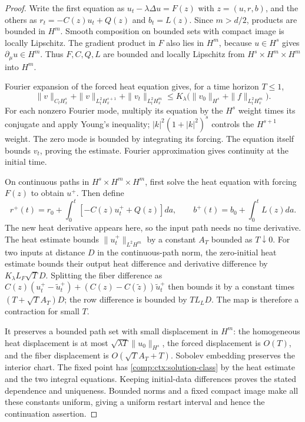 \begin{proof}
Write the first equation as $u_t-\lambda\Delta u=F(z)$ with $z=(u,r,b)$, and the others as $r_t=-C(z)u_t+Q(z)$ and $b_t=L(z)$. Since $m>d/2$, products are bounded in $H^m$. Smooth composition on bounded sets with compact image is locally Lipschitz. The gradient product in $F$ also lies in $H^m$, because $u\in H^s$ gives $\partial_\mu u\in H^m$. Thus $F,C,Q,L$ are bounded and locally Lipschitz from $H^s\times H^m\times H^m$ into $H^m$.

Fourier expansion of the forced heat equation gives, for a time horizon $T\leq1$,
\begin{equation}
 \|v\|_{C_tH^s_x}+\|v\|_{L^2_tH^{s+1}_x}
       +\|v_t\|_{L^2_tH^m_x}
 \leq K_\lambda\bigl(\|v_0\|_{H^s}+\|f\|_{L^2_tH^m_x}\bigr).
 \label{comp:ctx:heat-estimate}
\end{equation}
For each nonzero Fourier mode, multiply its equation by the $H^s$ weight times its conjugate and apply Young's inequality; $|k|^2(1+|k|^2)^s$ controls the $H^{s+1}$ weight. The zero mode is bounded by integrating its forcing. The equation itself bounds $v_t$, proving the estimate. Fourier approximation gives continuity at the initial time.

On continuous paths in $H^s\times H^m\times H^m$, first solve the heat equation with forcing $F(z)$ to obtain $u^+$. Then define
\begin{equation}
 r^+(t)=r_0+\int_0^t[-C(z)u_t^++Q(z)]da,\qquad
 b^+(t)=b_0+\int_0^tL(z)da.
 \label{comp:ctx:iteration}
\end{equation}
The new heat derivative appears here, so the input path needs no time derivative. The heat estimate bounds $\|u_t^+\|_{L^2H^m}$ by a constant $A_T$ bounded as $T\downarrow0$. For two inputs at distance $D$ in the continuous-path norm, the zero-initial heat estimate bounds their output heat difference and derivative difference by $K_\lambda L_F\sqrt T D$. Splitting the fiber difference as $C(z)(u_t^+-\widetilde u_t^+)+(C(z)-C(\widetilde z))\widetilde u_t^+$ then bounds it by a constant times $(T+\sqrt T A_T)D$; the row difference is bounded by $TL_LD$. The map is therefore a contraction for small $T$.

It preserves a bounded path set with small displacement in $H^m$: the homogeneous heat displacement is at most $\sqrt{\lambda T}\|u_0\|_{H^s}$, the forced displacement is $O(T)$, and the fiber displacement is $O(\sqrt T A_T+T)$. Sobolev embedding preserves the interior chart. The fixed point has \cref{comp:ctx:solution-class} by the heat estimate and the two integral equations. Keeping initial-data differences proves the stated dependence and uniqueness. Bounded norms and a fixed compact image make all these constants uniform, giving a uniform restart interval and hence the continuation assertion.
\end{proof}

